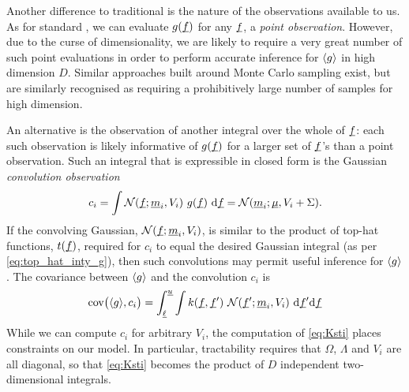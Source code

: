 \documentclass[twoside]{article}
\begin{document}
Another difference to traditional  is the nature of the observations available to us. As for standard , we can evaluate $g(\underline{\smash{f}})$ for any $\underline{\smash{f}}$, a \emph{point observation}. However, due to the curse of dimensionality, we are likely to require a very great number of such point evaluations in order to perform accurate inference for $\langle g \rangle$ in high dimension $D$. Similar approaches built around Monte Carlo sampling \citep{genz1992numerical} exist, but are similarly recognised as requiring a prohibitively large number of samples for high dimension. 


An alternative is the observation of another integral over the whole of $\underline{\smash{f}}$: each such observation is likely informative of $g(\underline{\smash{f}})$ for a larger set of $\underline{\smash{f}}$'s than a point observation.
Such an integral that is expressible in closed form is the Gaussian \emph{convolution observation}
 \begin{equation}\label{eq:conv}
 c_i = \int \mathcal{N}(\underline{\smash{f}};\underline{\smash{m}}_i,V_i)~g(\underline{\smash{f}})~\mathrm{d} \underline{\smash{f}} = \mathcal{N}(\underline{\smash{m}}_i;\underline{\smash{\mu}},V_i+\Sigma).
\end{equation}
 If the convolving Gaussian, $\mathcal{N}(\underline{\smash{f}};\underline{\smash{m}}_i,V_i)$, is similar to the product of top-hat functions, $t(\underline{\smash{f}})$, required for $c_i$ to equal the desired Gaussian integral (as per \eqref{eq:top_hat_inty_g}), then such convolutions may permit useful inference for $\langle g \rangle$. The covariance between $\langle g \rangle$ and the convolution $c_i$ is
\begin{align}\label{eq:Ksti}
\text{cov}\bigl(\langle g \rangle, c_i\bigr) =
\int_{\underline{\smash{\ell}}}^{\underline{\smash{u}}} \int  k(\underline{\smash{f}}, \underline{\smash{f}}')~\mathcal{N}(\underline{\smash{f}}';\underline{\smash{m}}_i,V_i)~\mathrm{d} \underline{\smash{f}}' \mathrm{d} \underline{\smash{f}} 
\end{align}
While we can compute $c_i$ for arbitrary $V_i$, the computation of \eqref{eq:Ksti} places constraints on our model. In particular, tractability requires that $\Omega$, $\Lambda$ and $V_i$ are all diagonal, so that \eqref{eq:Ksti} becomes the product of $D$ independent two-dimensional integrals.
\end{document}

